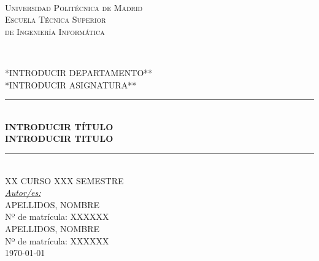 \documentclass[12pt,a4paper, spanish]{article}
\begin{document}
\begin{titlepage}
  \newcommand{\HRule}{\rule{\linewidth}{0.5mm}}
  \centering

  \textsc{}\\[0.25cm]

  \textsc{\huge{Universidad Politécnica de Madrid}}\\[0.5cm]

  \textsc{\LARGE Escuela Técnica Superior\\ de Ingeniería Informática}\\[0.3cm]

  \begin{figure}[H] %
    \centering
    \qquad
    \\[0.5cm]
  \end{figure}

  \textsc{\Large **INTRODUCIR DEPARTAMENTO**}\\[0.25cm]
  \textsc{\large **INTRODUCIR ASIGNATURA**}\\[0.25cm]

  \HRule\\[0.4cm]

  {\huge\bfseries INTRODUCIR TÍTULO\\[0.4cm] INTRODUCIR TITULO}\\[0.4cm]

  \HRule\\[1.25cm]


  \textsc{\large XX CURSO XXX SEMESTRE}\\[1.5cm]

  {\large\underline{\textit{Autor/es:}}}\\[0.2cm]
     \textsc{APELLIDOS, NOMBRE}\\
             Nº de matrícula: XXXXXX\\
     [0.5cm]
     \textsc{APELLIDOS, NOMBRE}\\
             Nº de matrícula: XXXXXX\\[0.5cm]

   \vfill\vfill\vfill
   {\large\today}

\end{titlepage}
\end{document}
